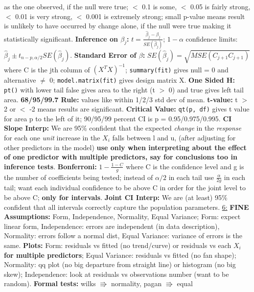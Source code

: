 \documentclass[8pt]{extarticle}
\begin{document}
as the one observed, if the null were true; $<$ 0.1 is some, $<$ 0.05 is fairly 
strong, $<$ 0.01 is very strong, $<$ 0.001 is extremely strong; small p-value 
means result is unlikely to have occurred by change alone, if the null were true 
making it statistically significant.
\textbf{Inference on $\beta_j$:} $t = \frac{\hat{\beta}_j - \beta_j}{SE(\hat{\beta}_j)}$;
$ 1 - \alpha$ confidence limits: $\hat{\beta}_j \pm t_{n-p, \alpha/2}SE(\hat{\beta}_j)$.
\textbf{Standard Error of $\beta$:} $SE(\hat{\beta}_j) = \sqrt{MSE(C_{j+1}C_{j+1})}$ 
where C is the jth column of $(X^TX)^{-1}$; \texttt{summary(fit)} gives null = 0
and alternative $\neq$ 0; \texttt{model.matrix(fit)} gives design matrix X.
\textbf{One Sided H:} \texttt{pt()} with lower tail false gives area to the right
(t $>$ 0) and true gives left tail area.
\textbf{68/95/99.7 Rule:} values like within 1/2/3 std dev of mean.
\textbf{t-value:} t $>$ 2 or $<$ -2 means results are significant.
\textbf{Critical Value:} \texttt{qt(p, df)} gives t value for area p to the left of it;
90/95/99 percent CI is p = 0.95/0.975/0.995.
\textbf{CI Slope Interp:} We are 95\% confident that the expected \textit{change} 
in the \textit{response} for each one \textit{unit} increase in the \textit{$X_i$}
falls between l and u, (after adjusting for other predictors in the model) 
\textbf{use only when interpreting about the effect of one predictor with multiple
predictors, say for conclusions too in inference tests}.
\textbf{Bonferroni:} $1 - \frac{1-C}{g}$ where C is the confidence level and g is
the number of coefficients being tested; instead of $\alpha/2$ in each tail 
use $\frac{\alpha}{2g}$ in each tail; want each individual confidence to be 
above C in order for the joint level to be above C; \textbf{only for intervals}.
\textbf{Joint CI Interp:} We are (at least) 95\% confident that all intervals 
correctly capture the population parameters.
\underline{6:}
\textbf{FINE Assumptions:} Form, Independence, Normality, Equal Variance;
Form: expect linear form, Independence: errors are independent (in data 
description), Normality: errors follow a normal dist, Equal Variance: variance 
of errors is the same.
\textbf{Plots:} Form: residuals vs fitted (no trend/curve) or residuals vs each 
$X_i$ \textbf{for multiple predictors}; Equal Variance: residuals vs fitted 
(no fan shape); Normality: qq plot (no big departure from straight line) or 
histogram (no big skew); Independence: look at residuals vs observations 
number (want to be random).
\textbf{Formal tests:} wilks $\Rrightarrow$ normality, pagan $\Rrightarrow$ equal 
\end{document}
